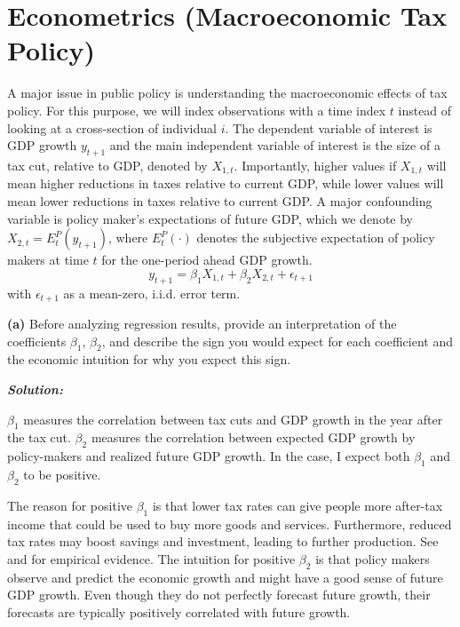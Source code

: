 \documentclass[12pt, letterpaper]{article}
\begin{document}
\section{Econometrics (Macroeconomic Tax Policy)}
A major issue in public policy is understanding the macroeconomic effects of tax policy. For this purpose, we will index observations with a time index $t$ instead of looking at a cross-section of individual $i$. The dependent variable of interest is GDP growth $y_{t+1}$ and the main independent variable of interest is the size of a tax cut, relative to GDP, denoted by $X_{1,t}$. Importantly, higher values if $X_{1,t}$ will mean higher reductions in taxes relative to current GDP, while lower values will mean lower reductions in taxes relative to current GDP. A major confounding variable is policy maker's expectations of future GDP, which we denote by $X_{2,t} = E_t^P(y_{t+1})$, where $E_t^P(\cdot)$ denotes the subjective expectation of policy makers at time $t$ for the one-period ahead GDP growth.
\begin{equation}
    \label{eq:sibalP3Q3_yX1X2}
    y_{t+1} = \beta_1 X_{1,t} + \beta_2 X_{2,t} + \epsilon_{t+1}
\end{equation}
with $\epsilon_{t+1}$ as a mean-zero, i.i.d. error term.

\noindent\textbf{(a)} Before analyzing regression results, provide an interpretation of the coefficients $\beta_1$, $\beta_2$, and describe the sign you would expect for each coefficient and the economic intuition for why you expect this sign.

\begin{shaded}
\noindent\textbf{\textit{Solution:}}\par
$\beta_1$ measures the correlation between tax cuts and GDP growth in the year after the tax cut. $\beta_2$ measures the correlation between expected GDP growth by policy-makers and realized future GDP growth. In the case, I expect both $\beta_1$ and $\beta_2$ to be positive.

The reason for positive $\beta_1$ is that lower tax rates can give people more after-tax income that could be used to buy more goods and services. Furthermore, reduced tax rates may boost savings and investment, leading to further production. See \citet{Romer2010} and \citet{Serrato2018} for empirical evidence. The intuition for positive $\beta_2$ is that policy makers observe and predict the economic growth and might have a good sense of future GDP growth. Even though they do not perfectly forecast future growth, their forecasts are typically positively correlated with future growth.
\end{shaded}
\end{document}
